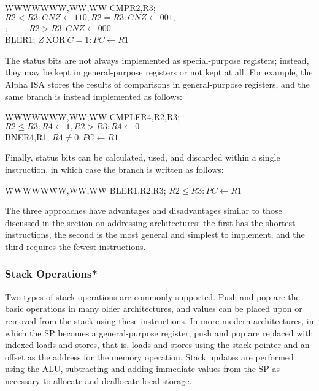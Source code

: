\begin{tabbing}
\hspace{.5in}\=WWWWW\=WW,WW,WW\=\kill
\>CMP\>R2,R3\>; $R2 < R3: CNZ \leftarrow 110, R2 = R3: CNZ \leftarrow 001,$\\
\>\>\>;~~~~~$R2 > R3: CNZ \leftarrow 000$\\
\>BLE\>R1\>; $Z~\mbox{XOR}~C = 1: PC \leftarrow R1$
\end{tabbing}\vspace{-6pt}
%
The status bits are not always implemented as special-purpose
registers; instead, they may be kept in general-purpose registers or
not kept at all.  For example, the Alpha ISA stores the results of
comparisons in general-purpose registers, and the same branch is
instead implemented as follows:
%
\vspace{-6pt}\begin{tabbing}
\hspace{.5in}\=WWWWW\=WW,WW,WW\=\kill
\>CMPLE\>R4,R2,R3\>; $R2 \leq R3: R4 \leftarrow 1, R2 > R3: R4 \leftarrow 0$\\
\>BNE\>R4,R1\>; $R4 \neq 0: PC \leftarrow R1$
\end{tabbing}\vspace{-6pt}
%
Finally, status bits can be calculated, used, and discarded within
a single instruction, in which case the branch is written as follows:
%
\vspace{-6pt}\begin{tabbing}
\hspace{.5in}\=WWWWW\=WW,WW,WW\=\kill
\>BLE\>R1,R2,R3\>; $R2 \leq R3: PC \leftarrow R1$
\end{tabbing}\vspace{-6pt}
%
The three approaches have advantages and disadvantages similar to
those discussed in the section on addressing architectures: the first
has the shortest instructions, the second is the most general and
simplest to implement, and the third requires the fewest instructions.\\


\subsubsection{Stack Operations*}

Two types of stack operations are commonly supported.  Push and pop
are the basic operations in many older architectures, and values can
be placed upon or removed from the stack using these instructions.  In
more modern architectures, in which the SP becomes a general-purpose
register, push and pop are replaced with indexed loads and stores,
that is, loads and stores using the stack pointer and an offset as the
address for the memory operation.  Stack updates are performed using
the ALU, subtracting and adding immediate values from the SP as
necessary to allocate and deallocate local storage.

